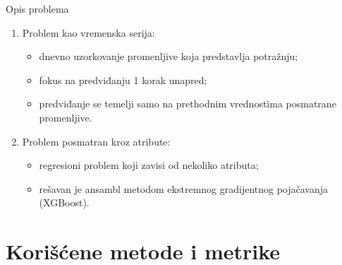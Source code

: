 \documentclass{beamer}
\begin{document}
\begin{frame}{Opis problema}
\begin{enumerate}
    \item Problem kao vremenska serija:
    \begin{itemize}
        \item dnevno uzorkovanje promenljive koja predstavlja potražnju;
        \item fokus na predviđanju 1 korak unapred;
        \item predviđanje se temelji samo na prethodnim vrednostima posmatrane promenljive.
    \end{itemize}
    \item Problem posmatran kroz atribute:
        \begin{itemize}
            \item regresioni problem koji zavisi od nekoliko atributa;
            \item rešavan je ansambl metodom ekstremnog gradijentnog pojačavanja (XGBoost).
        \end{itemize}
\end{enumerate}
\end{frame}

\section{Korišćene metode i metrike}
\end{document}
